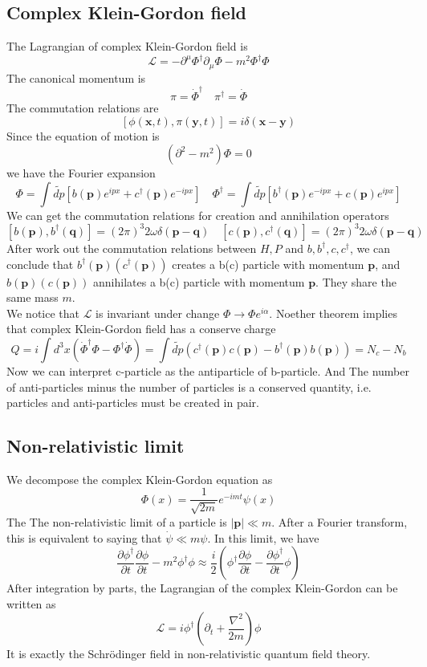 \documentclass[cyan]{elegantnote}
\begin{document}
\subsection{Complex Klein-Gordon field}
The Lagrangian of complex Klein-Gordon field is
\[\mathcal{L} = - \partial^{\mu}\Phi^{\dagger}\partial_{\mu}\Phi - m^2\Phi^{\dagger}\Phi\]
The canonical momentum is
\[\pi = \dot{\Phi}^{\dagger} \quad \pi^{\dagger} = \dot{\Phi}\]
The commutation relations are
\[[\phi(\bm{x},t),\pi(\bm{y},t)] = i\delta(\bm{x}-\bm{y})\]
Since the equation of motion is
\[(\partial^2-m^2)\Phi = 0\]
we have the Fourier expansion
\[\Phi = \int \widetilde{dp} [b(\bm{p})e^{ipx} + c^{\dagger}(\bm{p})e^{-ipx}] \quad \Phi^{\dagger} = \int \widetilde{dp} [b^{\dagger}(\bm{p})e^{-ipx} + c(\bm{p})e^{ipx}]\]
We can get the commutation relations for creation and annihilation operators
\[[b(\bm{p}), b^{\dagger}(\bm{q})] = (2\pi)^3 2\omega \delta(\bm{p}-\bm{q}) \quad [c(\bm{p}), c^{\dagger}(\bm{q})] = (2\pi)^3 2\omega \delta(\bm{p}-\bm{q})\]
After work out the commutation relations between $H,P$ and $b,b^{\dagger},c,c^{\dagger}$, we can conclude that $b^{\dagger}(\bm{p})(c^{\dagger}(\bm{p}))$ creates a b(c) particle with momentum $\bm{p}$, and $b(\bm{p})(c(\bm{p}))$ annihilates a b(c) particle with momentum $\bm{p}$. They share the same mass $m$.\\
We notice that $\mathcal{L}$ is invariant under change $\Phi \to \Phi e^{i\alpha}$. Noether theorem implies that complex Klein-Gordon field has a conserve charge
\[Q = i\int d^3x (\dot{\Phi}^{\dagger}\Phi - \Phi^{\dagger}\dot{\Phi}) = \int \widetilde{dp} (c^{\dagger}(\bm{p})c(\bm{p}) - b^{\dagger}(\bm{p})b(\bm{p})) = N_c - N_b\]
Now we can interpret c-particle as the antiparticle of b-particle. And The number of anti-particles minus the number of particles is a conserved quantity, i.e. particles and anti-particles must be created in pair.

\subsection{Non-relativistic limit}
We decompose the complex Klein-Gordon equation as
\[\Phi(x) = \frac{1}{\sqrt{2m}} e^{-imt}\psi(x)\]
The The non-relativistic limit of a particle is $|\bm{p}| \ll m$. After a Fourier transform, this is equivalent to saying that $\dot{\psi} \ll m\psi $. In this limit, we have
\[\frac{\partial \phi^{\dagger}}{\partial t} \frac{\partial \phi}{\partial t} - m^2 \phi^{\dagger}\phi \approx \frac{i}{2} \left( \phi^{\dagger}\frac{\partial \phi}{\partial t} - \frac{\partial \phi^{\dagger}}{\partial t} \phi\right)\]
After integration by parts, the Lagrangian of the complex Klein-Gordon can be written as
\[\mathcal{L} = i\phi^{\dagger}\left(\partial_t + \frac{\nabla^2}{2m} \right)\phi\]
It is exactly the Schr\"{o}dinger field in non-relativistic quantum field theory.
\end{document}
